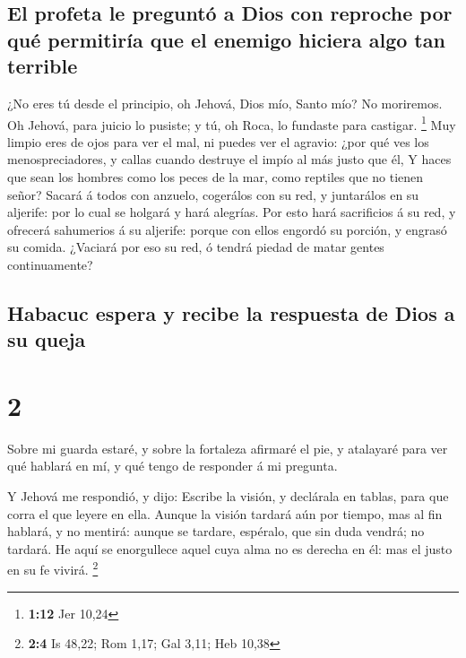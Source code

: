 \hypertarget{el-profeta-le-preguntuxf3-a-dios-con-reproche-por-quuxe9-permitiruxeda-que-el-enemigo-hiciera-algo-tan-terrible}{%
\subsection{El profeta le preguntó a Dios con reproche por qué
permitiría que el enemigo hiciera algo tan
terrible}\label{el-profeta-le-preguntuxf3-a-dios-con-reproche-por-quuxe9-permitiruxeda-que-el-enemigo-hiciera-algo-tan-terrible}}

 ¿No eres tú desde el principio, oh Jehová, Dios mío,
Santo mío? No moriremos. Oh Jehová, para juicio lo pusiste; y tú, oh
Roca, lo fundaste para castigar. \footnote{\textbf{1:12} Jer 10,24}
 Muy limpio eres de ojos para ver el mal, ni puedes ver
el agravio: ¿por qué ves los menospreciadores, y callas cuando destruye
el impío al más justo que él,  Y haces que sean los
hombres como los peces de la mar, como reptiles que no tienen señor?
 Sacará á todos con anzuelo, cogerálos con su red, y
juntarálos en su aljerife: por lo cual se holgará y hará alegrías.
 Por esto hará sacrificios á su red, y ofrecerá
sahumerios á su aljerife: porque con ellos engordó su porción, y engrasó
su comida.  ¿Vaciará por eso su red, ó tendrá piedad de
matar gentes continuamente?

\hypertarget{habacuc-espera-y-recibe-la-respuesta-de-dios-a-su-queja}{%
\subsection{Habacuc espera y recibe la respuesta de Dios a su
queja}\label{habacuc-espera-y-recibe-la-respuesta-de-dios-a-su-queja}}

\hypertarget{section-1}{%
\section{2}\label{section-1}}

 Sobre mi guarda estaré, y sobre la fortaleza afirmaré el
pie, y atalayaré para ver qué hablará en mí, y qué tengo de responder á
mi pregunta.

 Y Jehová me respondió, y dijo: Escribe la visión, y
declárala en tablas, para que corra el que leyere en ella.
 Aunque la visión tardará aún por tiempo, mas al fin
hablará, y no mentirá: aunque se tardare, espéralo, que sin duda vendrá;
no tardará.  He aquí se enorgullece aquel cuya alma no es
derecha en él: mas el justo en su fe vivirá. \footnote{\textbf{2:4} Is
  48,22; Rom 1,17; Gal 3,11; Heb 10,38}

